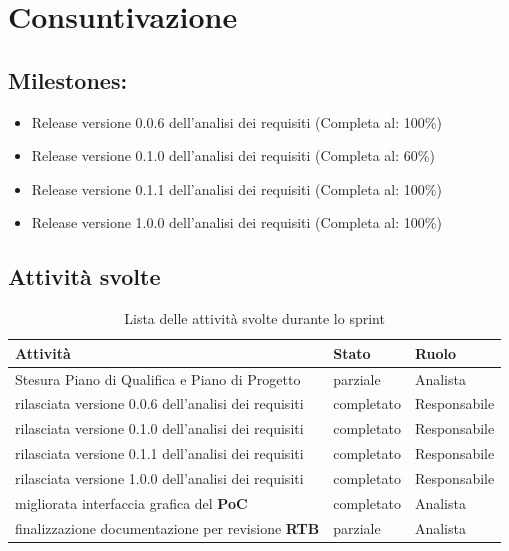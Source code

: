 \section{Consuntivazione}

\subsection{Milestones:}
\begin{itemize}
    \item Release versione 0.0.6 dell'analisi dei requisiti (Completa al: 100\%)
    \item Release versione 0.1.0 dell'analisi dei requisiti (Completa al: 60\%)
    \item Release versione 0.1.1 dell'analisi dei requisiti (Completa al: 100\%)
    \item Release versione 1.0.0 dell'analisi dei requisiti (Completa al: 100\%)
\end{itemize}

\subsection{Attività svolte}

\begin{table}[H]
    \begin{xltabular}{\textwidth}{X l l}
        
         \textbf{Attività} & \textbf{Stato} & \textbf{Ruolo}\\
        \endhead
        \hline
        Stesura Piano di Qualifica e Piano di Progetto & parziale & Analista \\
        rilasciata versione 0.0.6 dell'analisi dei requisiti & completato & Responsabile \\
        rilasciata versione 0.1.0 dell'analisi dei requisiti & completato & Responsabile \\
        rilasciata versione 0.1.1 dell'analisi dei requisiti & completato & Responsabile \\
        rilasciata versione 1.0.0 dell'analisi dei requisiti & completato & Responsabile \\
        migliorata interfaccia grafica del \textbf{PoC} & completato & Analista \\
        finalizzazione documentazione per revisione \textbf{RTB} & parziale & Analista \\
    \end{xltabular}
    \caption{Lista delle attività svolte durante lo sprint}
\end{table}



